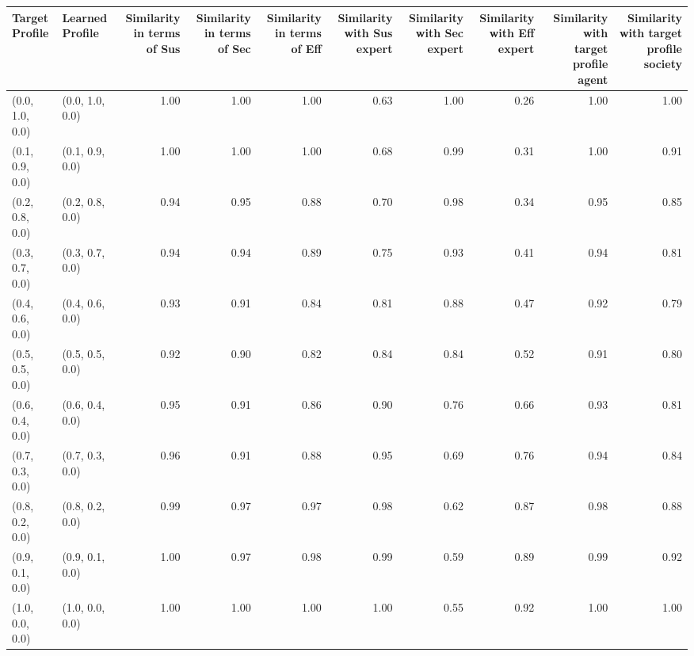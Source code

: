 \begin{tabular}{llrrrrrrrr}
\toprule
Target Profile & Learned Profile & Similarity in terms of Sus & Similarity in terms of Sec & Similarity in terms of Eff & Similarity with Sus expert & Similarity with Sec expert & Similarity with Eff expert & Similarity with target profile agent & Similarity with target profile society \\
\midrule
(0.0, 1.0, 0.0) & (0.0, 1.0, 0.0) & 1.00 & 1.00 & 1.00 & 0.63 & 1.00 & 0.26 & 1.00 & 1.00 \\
(0.1, 0.9, 0.0) & (0.1, 0.9, 0.0) & 1.00 & 1.00 & 1.00 & 0.68 & 0.99 & 0.31 & 1.00 & 0.91 \\
(0.2, 0.8, 0.0) & (0.2, 0.8, 0.0) & 0.94 & 0.95 & 0.88 & 0.70 & 0.98 & 0.34 & 0.95 & 0.85 \\
(0.3, 0.7, 0.0) & (0.3, 0.7, 0.0) & 0.94 & 0.94 & 0.89 & 0.75 & 0.93 & 0.41 & 0.94 & 0.81 \\
(0.4, 0.6, 0.0) & (0.4, 0.6, 0.0) & 0.93 & 0.91 & 0.84 & 0.81 & 0.88 & 0.47 & 0.92 & 0.79 \\
(0.5, 0.5, 0.0) & (0.5, 0.5, 0.0) & 0.92 & 0.90 & 0.82 & 0.84 & 0.84 & 0.52 & 0.91 & 0.80 \\
(0.6, 0.4, 0.0) & (0.6, 0.4, 0.0) & 0.95 & 0.91 & 0.86 & 0.90 & 0.76 & 0.66 & 0.93 & 0.81 \\
(0.7, 0.3, 0.0) & (0.7, 0.3, 0.0) & 0.96 & 0.91 & 0.88 & 0.95 & 0.69 & 0.76 & 0.94 & 0.84 \\
(0.8, 0.2, 0.0) & (0.8, 0.2, 0.0) & 0.99 & 0.97 & 0.97 & 0.98 & 0.62 & 0.87 & 0.98 & 0.88 \\
(0.9, 0.1, 0.0) & (0.9, 0.1, 0.0) & 1.00 & 0.97 & 0.98 & 0.99 & 0.59 & 0.89 & 0.99 & 0.92 \\
(1.0, 0.0, 0.0) & (1.0, 0.0, 0.0) & 1.00 & 1.00 & 1.00 & 1.00 & 0.55 & 0.92 & 1.00 & 1.00 \\
\bottomrule
\end{tabular}
